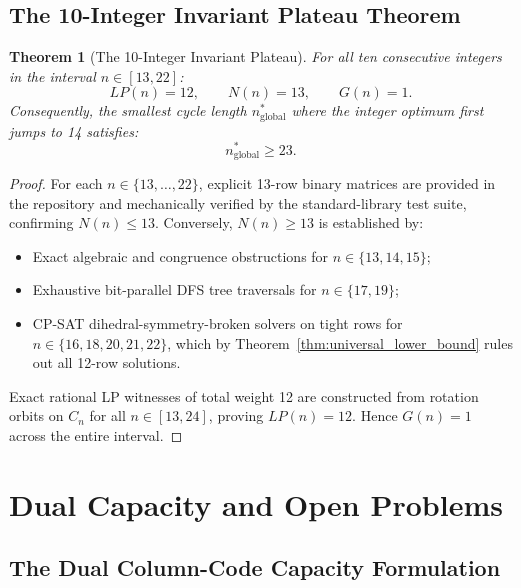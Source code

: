 \documentclass[11pt,a4paper]{article}
\newtheorem{theorem}{Theorem}[section]
\theoremstyle{definition}
\theoremstyle{remark}
\begin{document}
\subsection{The 10-Integer Invariant Plateau Theorem}

\begin{theorem}[The 10-Integer Invariant Plateau]
\label{thm:plateau}
For all ten consecutive integers in the interval $n \in [13, 22]$:
\begin{equation}
    LP(n) = 12, \qquad N(n) = 13, \qquad G(n) = 1.
\end{equation}
Consequently, the smallest cycle length $n^*_{\text{global}}$ where the integer optimum first jumps to 14 satisfies:
\begin{equation}
    n^*_{\text{global}} \ge 23.
\end{equation}
\end{theorem}

\begin{proof}
For each $n \in \{13, \dots, 22\}$, explicit 13-row binary matrices are provided in the repository and mechanically verified by the standard-library test suite, confirming $N(n) \le 13$.
Conversely, $N(n) \ge 13$ is established by:
\begin{itemize}
    \item Exact algebraic and congruence obstructions for $n \in \{13, 14, 15\}$;
    \item Exhaustive bit-parallel DFS tree traversals for $n \in \{17, 19\}$;
    \item CP-SAT dihedral-symmetry-broken solvers on tight rows for $n \in \{16, 18, 20, 21, 22\}$, which by Theorem~\ref{thm:universal_lower_bound} rules out all 12-row solutions.
\end{itemize}
Exact rational LP witnesses of total weight 12 are constructed from rotation orbits on $C_n$ for all $n \in [13, 24]$, proving $LP(n) = 12$. Hence $G(n) = 1$ across the entire interval.
\end{proof}

\section{Dual Capacity and Open Problems}
\label{sec:open_problems}

\subsection{The Dual Column-Code Capacity Formulation}
\end{document}

